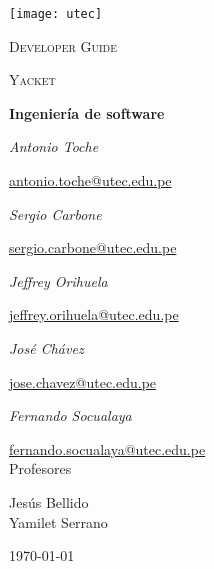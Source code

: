 \documentclass{article}
\begin{document}
\begin{titlepage}
	\centering
	\texttt{[image: utec]}\par\vspace{1cm}
	{\scshape\LARGE Developer Guide \par}
	\vspace{0.5cm}
	{\scshape\Large Yacket\par}
	\vspace{0.5cm}
	{\huge\bfseries Ingeniería de software\par}
	\vspace{1.0cm}
	{\Large\itshape Antonio Toche\par}
	\href{mailto:antonio.toche@utec.edu.pe}{antonio.toche@utec.edu.pe}\\
	\vspace{1.0cm}
	{\Large\itshape Sergio Carbone\par}
	\href{mailto:sergio.carbone@utec.edu.pe}{sergio.carbone@utec.edu.pe}\\
	\vspace{1.0cm}
	{\Large\itshape Jeffrey Orihuela\par}
	\href{mailto:sergio.carbone@utec.edu.pe}{jeffrey.orihuela@utec.edu.pe}\\
	\vspace{1.0cm}
	{\Large\itshape José Chávez\par}
	\href{mailto:jose.chavez@utec.edu.pe}{jose.chavez@utec.edu.pe}\\
	\vspace{1.0cm}
	{\Large\itshape Fernando Socualaya\par}
	\href{mailto:fernando.socualaya@utec.edu.pe}{fernando.socualaya@utec.edu.pe}\\
	\vspace{1.0cm}
	\vfill
	Profesores\par
	Jesús Bellido\\
	Yamilet Serrano\\
	\vfill
	{\large \today\par}
\end{titlepage}
\end{document}
